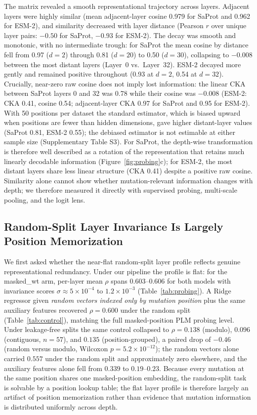 \documentclass[11pt,a4paper]{article}
\newcommand{\revised}[1]{#1}
\newcommand{\rtwo}[1]{#1}
\newcommand{\rthree}[1]{#1}
\begin{document}
The matrix revealed a smooth representational trajectory across layers. Adjacent layers
were highly similar (\rthree{mean adjacent-layer cosine 0.979 for SaProt and 0.962 for
ESM-2}), and similarity \rtwo{decreased with
layer distance (Pearson $r$ over unique layer pairs: $-0.50$ for SaProt, $-0.93$ for
ESM-2)}. \revised{The decay was smooth and
monotonic, with no intermediate trough: for SaProt the mean cosine by distance fell
from 0.97 ($d=2$) through \rthree{0.81} ($d=20$) to 0.50 ($d=30$), collapsing to \rthree{$-0.008$}
between the most distant layers (Layer~0 vs.\ Layer~32). ESM-2 decayed more gently and
remained positive throughout (0.93 at $d=2$, \rthree{0.54} at $d=32$). Crucially, near-zero raw
cosine does not imply lost information: the linear CKA between SaProt layers 0 and 32
was \rthree{0.78} while their cosine was \rthree{$-0.008$ (ESM-2: CKA 0.41, cosine 0.54; adjacent-layer
CKA 0.97 for SaProt and 0.95 for ESM-2). With 50 positions per dataset the standard
estimator, which is biased upward when positions are fewer than hidden dimensions, gave
higher distant-layer values (SaProt 0.81, ESM-2 0.55); the debiased estimator is not
estimable at either sample size (Supplementary Table S3). For SaProt,} the depth-wise
transformation is therefore
well described as a rotation of the representation that \rtwo{retains much} linearly
decodable information (Figure~\ref{fig:probing}c)\rthree{; for ESM-2, the most distant
layers share less linear structure (CKA 0.41) despite a positive raw cosine}.} \rtwo{Similarity alone cannot show
whether mutation-relevant information changes with depth; we therefore measured it
directly with supervised probing, multi-scale pooling, and the logit lens.}

\subsection{\revised{Random-Split Layer Invariance Is Largely Position Memorization}}

We first asked \revised{whether the near-flat random-split layer profile reflects genuine
representational redundancy. \rtwo{Under our pipeline the profile is flat}: for the
masked\_wt arm, per-layer mean $\rho$ spans
$0.603$--$0.606$ for both models with invariance scores $\sigma \approx 5 \times
10^{-4}$ to $1.2 \times 10^{-3}$ (Table~\ref{tab:probing}). A Ridge regressor given
\emph{random vectors indexed only by mutation position} plus the same auxiliary
features recovered $\rho = 0.600$ under the random split (Table~\ref{tab:control}),
matching the full masked-position PLM probing level. Under leakage-free splits the
same control collapsed to $\rho = 0.138$ (modulo), $0.096$ (contiguous, $n=57$), and
$0.135$ (position-grouped), a paired drop of $-0.46$ (random versus modulo, Wilcoxon
$p = 5.2 \times 10^{-12}$); the random vectors alone carried $0.557$ under the random
split and approximately zero elsewhere, and the auxiliary features alone fell from
$0.339$ to $0.19$--$0.23$. Because every mutation at the same position shares one
masked-position embedding, the random-split task is solvable by a position lookup
table; the flat layer profile is therefore largely an artifact of position
memorization rather than evidence that mutation information is distributed uniformly
across depth.}
\end{document}
